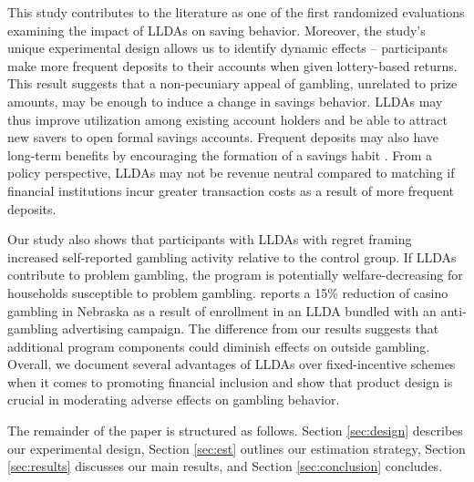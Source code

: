 \documentclass[12pt]{article}
\begin{document}

	This study contributes to the literature as one of the first randomized evaluations examining the impact of LLDAs on saving behavior. Moreover, the study's unique experimental design allows us to identify dynamic effects -- participants make more frequent deposits to their accounts when given lottery-based returns. This result suggests that a non-pecuniary appeal of gambling, unrelated to prize amounts, may be enough to induce a change in savings behavior. LLDAs may thus improve utilization among existing account holders and be able to attract new savers to open formal savings accounts. Frequent deposits may also have long-term benefits by encouraging the formation of a savings habit . From a policy perspective, LLDAs may not be revenue neutral compared to matching if financial institutions incur greater transaction costs as a result of more frequent deposits.


	Our study also shows that participants with LLDAs with regret framing increased self-reported gambling activity relative to the control group. If LLDAs contribute to problem gambling, the program is potentially welfare-decreasing for households susceptible to problem gambling.  reports a 15\% reduction of casino gambling in Nebraska as a result of enrollment in an LLDA bundled with an anti-gambling advertising campaign. The difference from our results suggests that additional program components could diminish effects on outside gambling. Overall, we document several advantages of LLDAs over fixed-incentive schemes when it comes to promoting financial inclusion and show that product design is crucial in moderating adverse effects on gambling behavior.


	The remainder of the paper is structured as follows. Section \ref{sec:design} describes our experimental design, Section \ref{sec:est} outlines our estimation strategy, Section \ref{sec:results} discusses our main results, and Section \ref{sec:conclusion} concludes.
\end{document}
